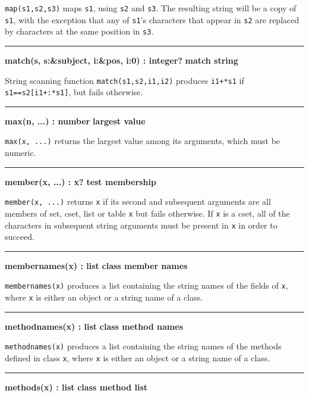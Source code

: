 \noindent
{}\texttt{map(s1,s2,s3)} maps \texttt{s1}, using
\texttt{s2} and \texttt{s3}. The resulting string will be a copy of
\texttt{s1}, with the exception that any of
\texttt{s1}'s characters that appear in \texttt{s2}
are replaced by characters at the same position in \texttt{s3}.

\bigskip\hrule\vspace{0.1cm}
\noindent
{\bf match(s, s:\&subject, i:\&pos, i:0) : integer? } \hfill {\bf match string}

\noindent
{}String scanning function \texttt{match(s1,s2,i1,i2)}
produces \texttt{i1+*s1} if \texttt{s1==s2[i1+:*s1]}, but fails
otherwise.

\bigskip\hrule\vspace{0.1cm}
\noindent
{\bf max(n, ...) : number } \hfill {\bf largest value}

\noindent
{}\texttt{max(x, ...)} returns the largest value among its
arguments, which must be numeric.

\bigskip\hrule\vspace{0.1cm}
\noindent
{\bf member(x, ...) : x? } \hfill {\bf test membership}

\noindent
{}\texttt{member(x, ...)} returns \texttt{x} if its second
and subsequent arguments are all members of set, cset, list or table
\texttt{x} but fails otherwise. If \texttt{x} is a cset, all of the
characters in subsequent string arguments must be present in \texttt{x}
in order to succeed.

\bigskip\hrule\vspace{0.1cm}
\noindent
{\bf membernames(x) : list } \hfill {\bf class member names}

\noindent
\texttt{membernames(x)} produces a list containing the string names of
the fields of \texttt{x}, where \texttt{x} is either an object or a
string name of a class.

\bigskip\hrule\vspace{0.1cm}
\noindent
{\bf methodnames(x) : list } \hfill {\bf class method names}

\noindent
\texttt{methodnames(x)} produces a list containing the string names of
the methods defined in class \texttt{x}, where \texttt{x} is either an
object or a string name of a class.

\bigskip\hrule\vspace{0.1cm}
\noindent
{\bf methods(x) : list } \hfill {\bf class method list}

